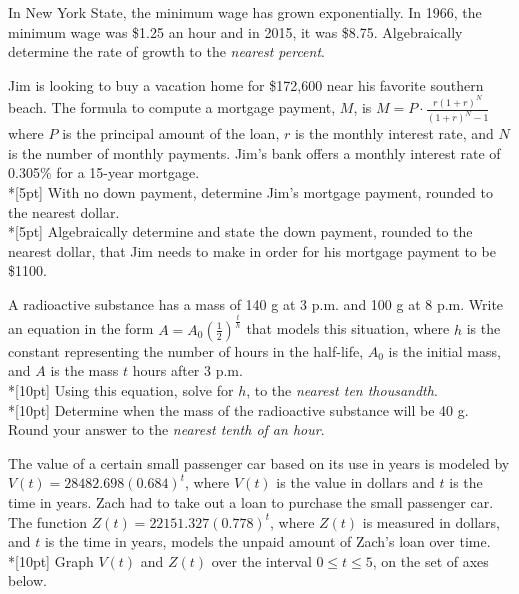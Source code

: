 \item %
In New York State, the minimum wage has grown exponentially. In 1966, the minimum wage was \$1.25 an hour and in 2015, it was \$8.75. Algebraically determine the rate of growth to the \textit{nearest percent}.

\item %
Jim is looking to buy a vacation home for \$172,600 near his favorite southern beach. The formula to compute a mortgage payment, $M$, is $\displaystyle M=P \cdot \frac{r(1+r)^N}{(1+r)^N-1}$ where $P$ is the principal amount of the loan, $r$ is the monthly interest rate, and $N$ is the number of monthly payments. Jim's bank offers a monthly interest rate of 0.305\% for a 15-year mortgage.\\*[5pt]
With no down payment, determine Jim's mortgage payment, rounded to the nearest dollar.\\*[5pt]
Algebraically determine and state the down payment, rounded to the nearest dollar, that Jim needs to make in order for his mortgage payment to be \$1100.

\item %
A radioactive substance has a mass of 140 g at 3 p.m. and 100 g at 8 p.m. Write an equation in the form $\displaystyle A = A_0 \left( \frac{1}{2}\right) ^\frac{t}{h}$ that models this situation, where $h$ is the constant representing the number of hours in the half-life, $A_0$ is the initial mass, and $A$ is the mass $t$ hours after 3 p.m.\\*[10pt]
Using this equation, solve for $h$, to the \textit{nearest ten thousandth}.\\*[10pt]
Determine when the mass of the radioactive substance will be 40 g. Round your answer to the \textit{nearest tenth of an hour}.

\newpage %
\item %
The value of a certain small passenger car based on its use in years is modeled by $V(t) =28482.698(0.684)^t$, 
where $V(t)$ is the value in dollars and $t$ is the time in years.
Zach had to take out a loan to purchase the small passenger car. The function $Z(t) = 22151.327(0.778)^t$, where $Z(t)$ is measured in dollars, 
and $t$ is the time in years, models the unpaid amount of Zach's loan over time.\\*[10pt]
Graph $V(t)$ and $Z(t)$ over the interval $0 \leq t \leq 5$, on the set of axes below.

